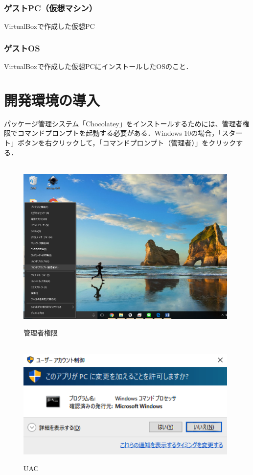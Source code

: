 \subsection{ゲストPC（仮想マシン）}
VirtualBoxで作成した仮想PC

\subsection{ゲストOS}
VirtualBoxで作成した仮想PCにインストールしたOSのこと．










\chapter{開発環境の導入}

パッケージ管理システム「Chocolatey」をインストールするためには、管理者権限でコマンドプロンプトを起動する必要がある．Windows 10の場合，「スタート」ボタンを右クリックして，「コマンドプロンプト（管理者）」をクリックする．
\begin{figure}[htb]
\centering　
\includegraphics[width=11cm]{desktop.png}
\caption{管理者権限}\label{tab:desktop}
\end{figure}


\begin{figure}[htb]
\centering　
\includegraphics[width=11cm]{uac.png}
\caption{UAC}\label{tab:uac}
\end{figure}
\newpage

